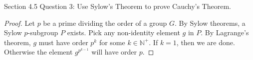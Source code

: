 Section 4.5 Question 3: Use Sylow's Theorem to prove Cauchy's Theorem.

\begin{proof}
  Let $p$ be a prime dividing the order of a group $G$. By Sylow theorems,
  a Sylow $p$-subgroup $P$ exists. Pick any non-identity element $g$ in
  $P$. By Lagrange's theorem, $g$ must have order $p^k$ for some
  $k\in\mathbb{N}^+$. If $k=1$, then we are done. Otherwise the element
  $g^{p^{k-1}}$ will have order $p$.
\end{proof}
